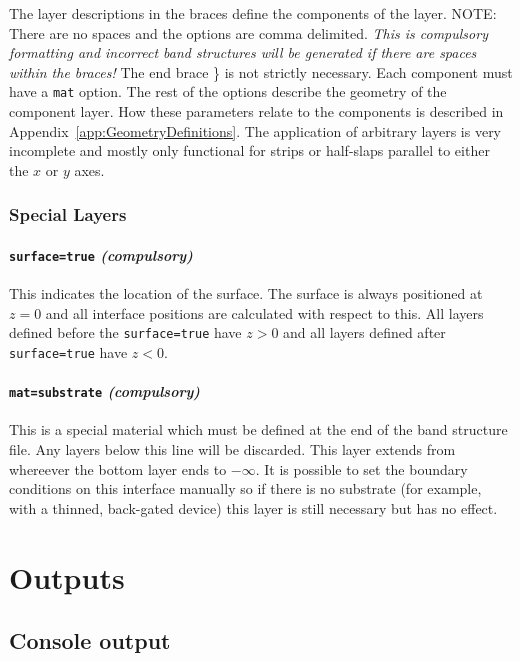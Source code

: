 \documentclass[12pt]{article}
\begin{document}
\vspace{0.5cm}

The layer descriptions in the braces define the components of the layer.  {\color{red} NOTE:}
There are no spaces and the options are comma delimited. \emph{This is compulsory formatting
and incorrect band structures will be generated if there are spaces within the braces!}  The
end brace \} is not strictly necessary.  Each component must have a \texttt{mat} option.  The
rest of the options describe the geometry of the component layer.  How these parameters
relate to the components is described in Appendix~\ref{app:GeometryDefinitions}.  The
application of arbitrary layers is very incomplete and mostly only functional for strips
or half-slaps parallel to either the $x$ or $y$ axes.

\subsubsection{Special Layers}
\label{subsubsec:SpecialLayers}

\paragraph{\texttt{surface=true} \emph{(compulsory)}}
This indicates the location of the surface.  The surface is always positioned at $z = 0$ and
all interface positions are calculated with respect to this.  All layers defined before the
\texttt{surface=true} have $z > 0$ and all layers defined after \texttt{surface=true} have
$z < 0$.

\paragraph{\texttt{mat=substrate} \emph{(compulsory)}}
This is a special material which must be defined at the end of the band structure file.  Any
layers below this line will be discarded.  This layer extends from whereever the bottom layer
ends to $-\infty$.  It is possible to set the boundary conditions on this interface manually
so if there is no substrate (for example, with a thinned, back-gated device) this layer is
still necessary but has no effect.


\section{Outputs}
\label{sec:Output}

\subsection{Console output}
\label{subsec:ConsoleOutput}
\end{document}
